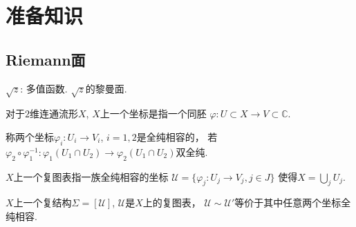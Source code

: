 
\newcommand{\id}{\operatorname{id}}
\newcommand{\Ima}{\operatorname{Im}}
\newcommand{\Ker}{\operatorname{Ker}}
\newcommand{\Res}{\operatorname{Res}}
\newcommand{\ord}{\operatorname{ord}}
\newcommand{\Div}{\operatorname{Div}}
\renewcommand{\Re}{\operatorname{Re}}
\renewcommand{\Im}{\operatorname{Im}}
\newcommand{\Opartial}{\overline{\partial}}
\newcommand{\varep}{\varepsilon}
\newcommand{\Over}{\overline}

	
\section{准备知识}
\subsection{Riemann面}
	
\begin{example}	
	$\sqrt{z}$: 多值函数. $\sqrt{z}$的黎曼面.
\end{example}
			
\begin{definition}
	对于$2$维连通流形$X$, $X$上一个坐标是指一个同胚
    $\varphi\colon U\subset X\rightarrow V\subset \mathbb{C}$.
\end{definition}
			
\begin{definition}
	称两个坐标$\varphi_i\colon U_i\rightarrow V_i$, $i=1,2$是全纯相容的，
    若$\varphi_2\circ \varphi_1^{-1}\colon \varphi_1(U_1\cap U_2)
    \rightarrow \varphi_2(U_1\cap U_2)$双全纯.
\end{definition}
			
\begin{definition}
    $X$上一个复图表指一族全纯相容的坐标
    $\mathscr{U}=\{\varphi_j\colon U_j\rightarrow V_j, j\in J\}$
    使得$X=\bigcup\limits_j U_j$.
\end{definition}
		
\begin{definition}
	$X$上一个复结构$\Sigma=[\mathscr{U}]$, $\mathscr{U}$是$X$上的复图表，
    $\mathscr{U}\sim \mathscr{U}'$等价于其中任意两个坐标全纯相容.
\end{definition}
			
